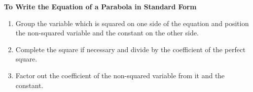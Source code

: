 \medskip

\colorbox{ResultColor}{\bbm

\centerline{\textbf{To Write the Equation of a Parabola in Standard Form}}

\begin{enumerate}

\item  Group the variable which is squared on one side of the equation and position the non-squared variable and the constant on the other side.

\item  Complete the square if necessary and divide by the coefficient of the perfect square.

\item  Factor out the coefficient of the non-squared variable from it and the constant.

\end{enumerate}

\ebm}

\medskip

